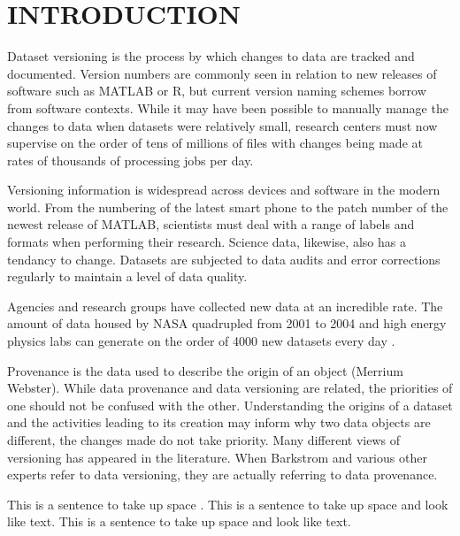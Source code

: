 
\chapter{INTRODUCTION}

Dataset versioning is the process by which changes to data are tracked and documented.  Version numbers are commonly seen in relation to new releases of software such as MATLAB or R, but current version naming schemes borrow from software contexts.  While it may have been possible to manually manage the changes to data when datasets were relatively small, research centers must now supervise on the order of tens of millions of files with changes being made at rates of thousands of processing jobs per day.

Versioning information is widespread across devices and software in the modern world.  From the numbering of the latest smart phone to the patch number of the newest release of MATLAB, scientists must deal with a range of labels and formats when performing their research.  Science data, likewise, also has a tendancy to change.  Datasets are subjected to data audits and error corrections regularly to maintain a level of data quality.

Agencies and research groups have collected new data at an incredible rate.  The amount of data housed by NASA quadrupled from 2001 to 2004 \cite{barkstromLibrary} and high energy physics labs can generate on the order of 4000 new datasets every day \cite{ATLAS}.

Provenance is the data used to describe the origin of an object (Merrium Webster).  While data provenance and data versioning are related, the priorities of one should not be confused with the other.  Understanding the origins of a dataset and the activities leading to its creation may inform why two data objects are different, the changes made do not take priority.  Many different views of versioning has appeared in the literature.  When Barkstrom and various other experts refer to data versioning, they are actually referring to data provenance.

This is a sentence to take up space \cite{thisbook}.
This is a sentence to take up space and look like text.
This is a sentence to take up space and look like text.

